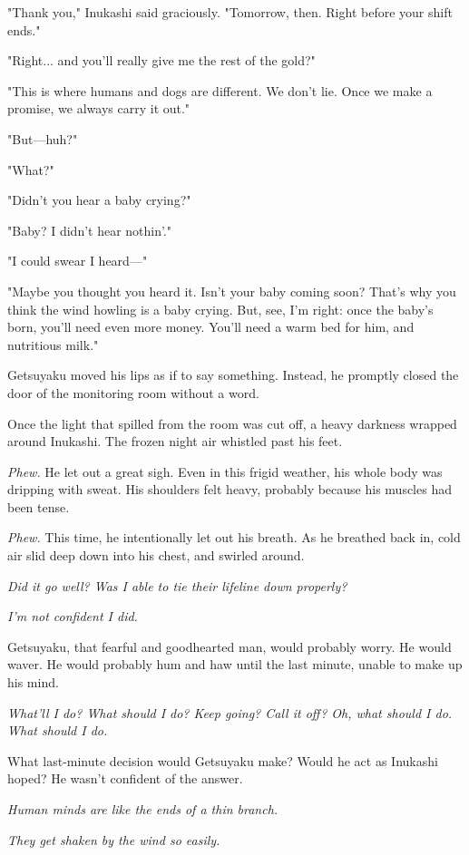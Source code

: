 "Thank you," Inukashi said graciously. "Tomorrow, then. Right before
your shift ends."

"Right... and you'll really give me the rest of the gold?"

"This is where humans and dogs are different. We don't lie. Once we make
a promise, we always carry it out."

"But---huh?"

"What?"

"Didn't you hear a baby crying?"

"Baby? I didn't hear nothin'."

"I could swear I heard---"

"Maybe you thought you heard it. Isn't your baby coming soon? That's why
you think the wind howling is a baby crying. But, see, I'm right: once
the baby's born, you'll need even more money. You'll need a warm bed for
him, and nutritious milk."

Getsuyaku moved his lips as if to say something. Instead, he promptly
closed the door of the monitoring room without a word.

Once the light that spilled from the room was cut off, a heavy darkness
wrapped around Inukashi. The frozen night air whistled past his feet.

\emph{Phew.} He let out a great sigh. Even in this frigid weather, his whole
body was dripping with sweat. His shoulders felt heavy, probably because
his muscles had been tense.

\emph{Phew.} This time, he intentionally let out his breath. As he breathed
back in, cold air slid deep down into his chest, and swirled around.

\emph{Did it go well? Was I able to tie their lifeline down properly?}

\emph{I'm not confident I did.}

Getsuyaku, that fearful and goodhearted man, would probably worry. He
would waver. He would probably hum and haw until the last minute, unable
to make up his mind.

\emph{What'll I do? What should I do? Keep going? Call it off? Oh, what should
I do. What should I do.}

What last-minute decision would Getsuyaku make? Would he act as Inukashi
hoped? He wasn't confident of the answer.

\emph{Human minds are like the ends of a thin branch.}

\emph{They get shaken by the wind so easily.}

